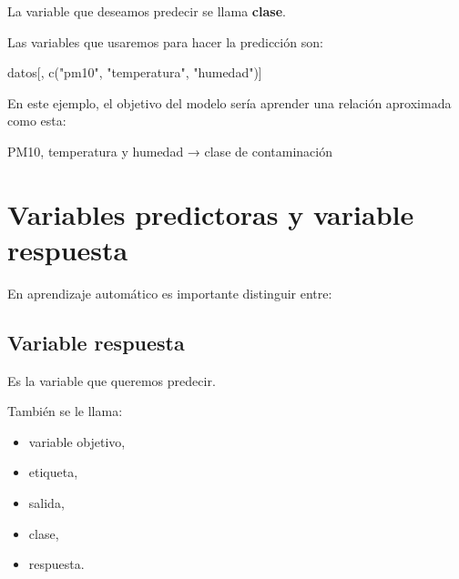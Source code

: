 \documentclass[
  11pt,
  letterpaper,
]{book}
\newenvironment{Shaded}{\begin{snugshade}}{\end{snugshade}}
\newcommand{\FunctionTok}[1]{\textcolor[rgb]{0.28,0.35,0.67}{#1}}
\newcommand{\NormalTok}[1]{\textcolor[rgb]{0.00,0.23,0.31}{#1}}
\newcommand{\SpecialCharTok}[1]{\textcolor[rgb]{0.37,0.37,0.37}{#1}}
\newcommand{\StringTok}[1]{\textcolor[rgb]{0.13,0.47,0.30}{#1}}
\providecommand{\tightlist}{%
  \setlength{\itemsep}{0pt}\setlength{\parskip}{0pt}}
\begin{document}
La variable que deseamos predecir se llama \textbf{clase}.

\begin{Shaded}
\end{Shaded}

Las variables que usaremos para hacer la predicción son:

\begin{Shaded}
\begin{Highlighting}[]
\NormalTok{datos[, }\FunctionTok{c}\NormalTok{(}\StringTok{"pm10"}\NormalTok{, }\StringTok{"temperatura"}\NormalTok{, }\StringTok{"humedad"}\NormalTok{)]}
\end{Highlighting}
\end{Shaded}

En este ejemplo, el objetivo del modelo sería aprender una relación
aproximada como esta:

\begin{Shaded}
\begin{Highlighting}[]
\NormalTok{PM10, temperatura y humedad  →  clase de contaminación}
\end{Highlighting}
\end{Shaded}

\section{Variables predictoras y variable
respuesta}\label{variables-predictoras-y-variable-respuesta}

En aprendizaje automático es importante distinguir entre:

\subsection{Variable respuesta}\label{variable-respuesta}

Es la variable que queremos predecir.

También se le llama:

\begin{itemize}
\tightlist
\item
  variable objetivo,
\item
  etiqueta,
\item
  salida,
\item
  clase,
\item
  respuesta.
\end{itemize}
\end{document}
